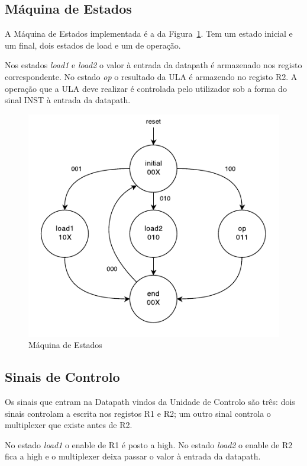 \documentclass[a4paper]{article}
\begin{document}
\subsection{Máquina de Estados}
A Máquina de Estados implementada é a da Figura~\ref{fig:FSMdiagram}. Tem um estado inicial e um final, dois estados de load e um de operação.

Nos estados \textit{load1} e \textit{load2} o valor à entrada da datapath é armazenado nos registo correspondente. No estado \textit{op} o resultado da ULA é armazendo no registo R2. A operação que a ULA deve realizar é controlada pelo utilizador sob a forma do sinal INST à entrada da datapath.

\begin{figure}[h]
	\centering
	\includegraphics[scale=0.28]{FSM}
	\caption{Máquina de Estados}
	\label{fig:FSMdiagram}
\end{figure}

\subsection{Sinais de Controlo}
Os sinais que entram na Datapath vindos da Unidade de Controlo são três: dois sinais controlam a escrita nos registos R1 e R2; um outro sinal controla o multiplexer que existe antes de R2.

No estado \textit{load1} o enable de R1 é posto a high. No estado \textit{load2} o enable de R2 fica a high e o multiplexer deixa passar o valor à entrada da datapath.
\end{document}
